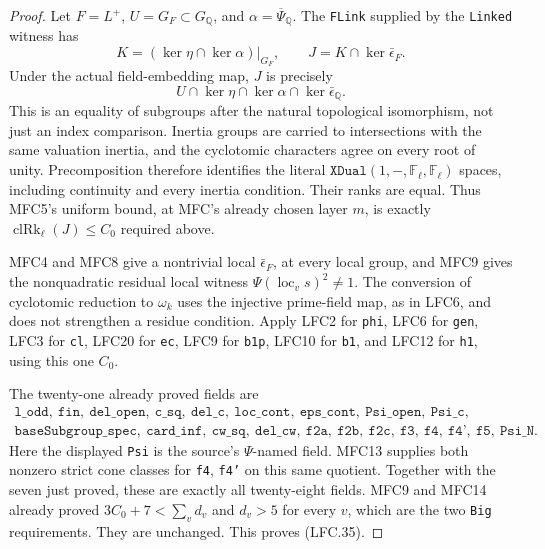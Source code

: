 \begin{proof}
Let \(F=L^+\), \(U=G_F\subset G_{\mathbb Q}\), and
\(\alpha=\overline\Psi_{\mathbb Q}\).
The \texttt{FLink} supplied by the \texttt{Linked} witness
has
\[
 K=(\ker\eta\cap\ker\alpha)|_{G_F},\qquad
 J=K\cap\ker\bar\epsilon_F.
 \]
Under the actual field-embedding map, \(J\) is precisely
\[
     U\cap\ker\eta\cap\ker\alpha\cap\ker\bar\epsilon_{\mathbb Q}.
                                                        \tag{LFC.36}
\]
This is an equality of subgroups after the natural
topological isomorphism, not just an index comparison.
Inertia groups are carried to intersections with the
same valuation inertia, and the cyclotomic characters
agree on every root of unity.  Precomposition therefore
identifies the literal \(\texttt{XDual}(1,-,\mathbb F_\ell,
\mathbb F_\ell)\) spaces, including continuity and
every inertia condition.
Their ranks are equal.  Thus MFC5's uniform bound,
at MFC's already chosen layer \(m\), is exactly
\(\operatorname{clRk}_\ell(J)\le C_0\) required above.

MFC4 and MFC8 give a nontrivial local
\(\bar\epsilon_F\), at every local group, and MFC9
gives the nonquadratic residual local witness
\(\Psi(\operatorname{loc}_v s)^2\ne1\).
The conversion of cyclotomic reduction to
\(\omega_k\) uses the injective prime-field map,
as in LFC6, and does not strengthen a residue condition.
Apply LFC2 for \texttt{phi}, LFC6 for \texttt{gen},
LFC3 for \texttt{cl}, LFC20 for \texttt{ec},
LFC9 for \texttt{b1p}, LFC10 for \texttt{b1},
and LFC12 for \texttt{h1}, using this one \(C_0\).

The twenty-one already proved fields are
\[
 \begin{gathered}
 \texttt{l\_odd},\ \texttt{fin},\ \texttt{del\_open},\
 \texttt{c\_sq},\ \texttt{del\_c},\ \texttt{loc\_cont},\
 \texttt{eps\_cont},\ \texttt{Psi\_open},\ \texttt{Psi\_c},\\
 \texttt{baseSubgroup\_spec},\ \texttt{card\_inf},\
 \texttt{cw\_sq},\ \texttt{del\_cw},\
 \texttt{f2a},\ \texttt{f2b},\ \texttt{f2c},\
 \texttt{f3},\ \texttt{f4},\ \texttt{f4'},\
 \texttt{f5},\ \texttt{Psi\_N}.
 \end{gathered}
 \]
Here the displayed \texttt{Psi} is the source's
\(\Psi\)-named field.  MFC13 supplies both nonzero
strict cone classes for \texttt{f4}, \texttt{f4'} on
this same quotient.  Together with the seven just
proved, these are exactly all twenty-eight fields.
MFC9 and MFC14 already proved
\(3C_0+7<\sum_v d_v\) and \(d_v>5\) for every \(v\),
which are the two \texttt{Big} requirements.
They are unchanged.  This proves (LFC.35).
\end{proof}

